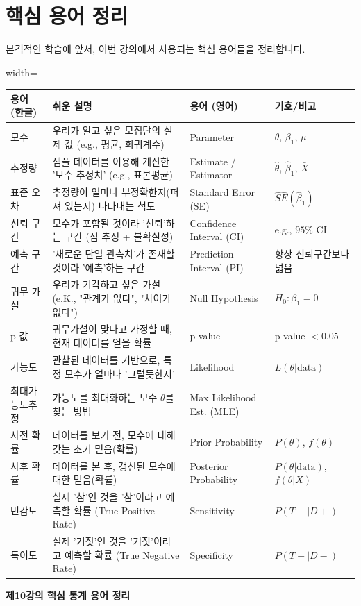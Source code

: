 \documentclass[11pt,a4paper]{book}
\providecommand{\captionof}[2]{\textbf{#2}}
\theoremstyle{definition}
\begin{document}
\section{핵심 용어 정리}

본격적인 학습에 앞서, 이번 강의에서 사용되는 핵심 용어들을 정리합니다.

\begin{tcolorbox}[title={핵심 용어집 (Glossary)}]
\begin{adjustbox}{width=\textwidth}
\begin{tabular}{lp{6cm}ll}
    \toprule
    \textbf{용어 (한글)} & \textbf{쉬운 설명} & \textbf{용어 (영어)} & \textbf{기호/비고} \\
    \midrule
    모수 & 우리가 알고 싶은 모집단의 실제 값 (e.g., 평균, 회귀계수) & Parameter & $\theta$, $\beta_1$, $\mu$ \\
    추정량 & 샘플 데이터를 이용해 계산한 '모수 추정치' (e.g., 표본평균) & Estimate / Estimator & $\hat{\theta}$, $\hat{\beta}_1$, $\bar{X}$ \\
    표준 오차 & 추정량이 얼마나 부정확한지(퍼져 있는지) 나타내는 척도 & Standard Error (SE) & $\hat{SE}(\hat{\beta}_1)$ \\
    신뢰 구간 & 모수가 포함될 것이라 '신뢰'하는 구간 (점 추정 + 불확실성) & Confidence Interval (CI) & e.g., $95\%$ CI \\
    예측 구간 & '새로운 단일 관측치'가 존재할 것이라 '예측'하는 구간 & Prediction Interval (PI) & 항상 신뢰구간보다 넓음 \\
    귀무 가설 & 우리가 기각하고 싶은 가설 (e.K., "관계가 없다", "차이가 없다") & Null Hypothesis & $H_0: \beta_1 = 0$ \\
    p-값 & 귀무가설이 맞다고 가정할 때, 현재 데이터를 얻을 확률 & p-value & p-value $< 0.05$ \\
    가능도 & 관찰된 데이터를 기반으로, 특정 모수가 얼마나 '그럴듯한지' & Likelihood & $L(\theta | \text{data})$ \\
    최대가능도추정 & 가능도를 최대화하는 모수 $\theta$를 찾는 방법 & Max Likelihood Est. (MLE) & \\
    사전 확률 & 데이터를 보기 전, 모수에 대해 갖는 초기 믿음(확률) & Prior Probability & $P(\theta)$, $f(\theta)$ \\
    사후 확률 & 데이터를 본 후, 갱신된 모수에 대한 믿음(확률) & Posterior Probability & $P(\theta | \text{data})$, $f(\theta|X)$ \\
    민감도 & 실제 '참'인 것을 '참'이라고 예측할 확률 (True Positive Rate) & Sensitivity & $P(T+ | D+)$ \\
    특이도 & 실제 '거짓'인 것을 '거짓'이라고 예측할 확률 (True Negative Rate) & Specificity & $P(T- | D-)$ \\
    \bottomrule
\end{tabular}
\end{adjustbox}
\captionof{table}{제10강의 핵심 통계 용어 정리}
\label{tab:glossary}
\end{tcolorbox}
\end{document}
